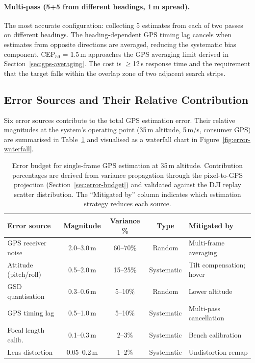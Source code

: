 \paragraph{Multi-pass (5+5 from different headings, 1\,m spread).}  The most accurate configuration: collecting 5 estimates from each of two passes on different headings.  The heading-dependent GPS timing lag cancels when estimates from opposite directions are averaged, reducing the systematic bias component.  CEP$_{50}$ = 1.5\,m approaches the GPS averaging limit derived in Section~\ref{sec:gps-averaging}.  The cost is $\geq$12\,s response time and the requirement that the target falls within the overlap zone of two adjacent search strips.

\subsection{Error Sources and Their Relative Contribution}\label{sec:error-contributions}

Six error sources contribute to the total GPS estimation error.  Their relative magnitudes at the system's operating point (35\,m altitude, 5\,m/s, consumer GPS) are summarised in Table~\ref{tab:error-budget-relative} and visualised as a waterfall chart in Figure~\ref{fig:error-waterfall}.

\begin{table}[htbp]
  \centering
  \caption{Error budget for single-frame GPS estimation at 35\,m altitude.  Contribution percentages are derived from variance propagation through the pixel-to-GPS projection (Section~\ref{sec:error-budget}) and validated against the DJI replay scatter distribution.  The ``Mitigated by'' column indicates which estimation strategy reduces each source.}
  \label{tab:error-budget-relative}
  \begin{tabular}{@{}lcccl@{}}
    \toprule
    \textbf{Error source} & \textbf{Magnitude} & \textbf{Variance \%} & \textbf{Type} & \textbf{Mitigated by} \\
    \midrule
    GPS receiver noise     & 2.0--3.0\,m  & 60--70\% & Random    & Multi-frame averaging \\
    Attitude (pitch/roll)  & 0.5--2.0\,m  & 15--25\% & Systematic & Tilt compensation; hover \\
    GSD quantisation       & 0.3--0.6\,m  & 5--10\%  & Random    & Lower altitude \\
    GPS timing lag         & 0.5--1.0\,m  & 5--10\%  & Systematic & Multi-pass cancellation \\
    Focal length calib.    & 0.1--0.3\,m  & 2--3\%   & Systematic & Bench calibration \\
    Lens distortion        & 0.05--0.2\,m & 1--2\%   & Systematic & Undistortion remap \\
    \bottomrule
  \end{tabular}
\end{table}

